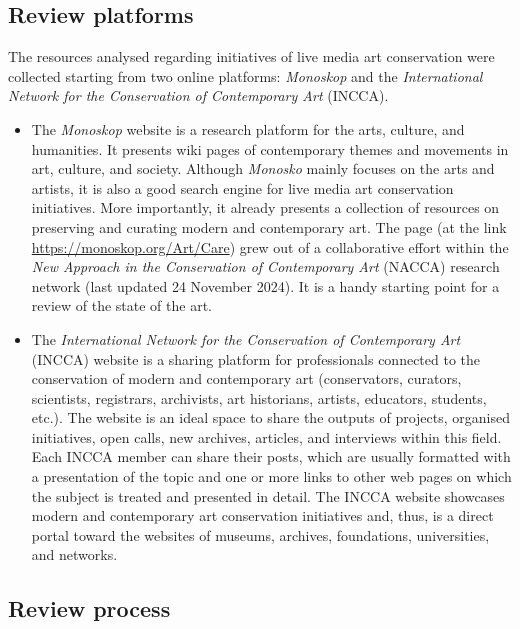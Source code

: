 \subsection{Review platforms}
The resources analysed regarding initiatives of live media art conservation were collected starting from two online platforms: \textit{Monoskop} and the \textit{International Network for the Conservation of Contemporary Art} (INCCA).
\begin{itemize}
    \item The \textit{Monoskop} website is a research platform for the arts, culture, and humanities. It presents wiki pages of contemporary themes and movements in art, culture, and society. Although \textit{Monosko} mainly focuses on the arts and artists, it is also a good search engine for live media art conservation initiatives. More importantly, it already presents a collection of resources on preserving and curating modern and contemporary art. The page (at the link \url{https://monoskop.org/Art/Care}) grew out of a collaborative effort within the \textit{New Approach in the Conservation of Contemporary Art} (NACCA) research network (last updated 24 November 2024). It is a handy starting point for a review of the state of the art.
    \item The \textit{International Network for the Conservation of Contemporary Art} (INCCA) website is a sharing platform for professionals connected to the conservation of modern and contemporary art (conservators, curators, scientists, registrars, archivists, art historians, artists, educators, students, etc.). The website is an ideal space to share the outputs of projects, organised initiatives, open calls, new archives, articles, and interviews within this field. Each INCCA member can share their posts, which are usually formatted with a presentation of the topic and one or more links to other web pages on which the subject is treated and presented in detail. The INCCA website showcases modern and contemporary art conservation initiatives and, thus, is a direct portal toward the websites of museums, archives, foundations, universities, and networks. 
\end{itemize}

\subsection{Review process}

